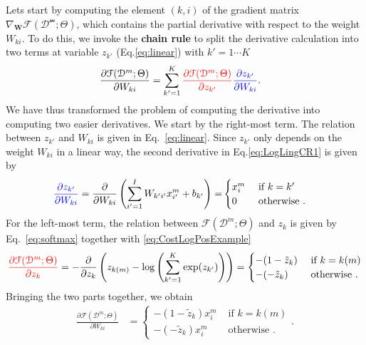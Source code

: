 Lets start by computing the element $(k,i)$ of the gradient matrix
$\nabla_\mathbf{W}\mathcal{F}(\mathcal{D^m};\Theta)$, which contains the partial
derivative with respect to the weight $W_{ki}$. To do this, we invoke the
\textbf{chain rule} to split the derivative calculation into two terms at
variable $z_{k'}$ (Eq.\ref{eq:linear}) with $k'=1\cdots K$
%
\begin{align}
\frac{\partial \mathcal{F}(\mathcal{D}^m;\Theta)}{\partial W_{ki}} & = \sum_{k'=1}^{K} { \color{red} \frac{\partial \mathcal{F}(\mathcal{D}^m;\Theta)}{\partial z_{k'}} }{ \color{blue} \frac{\partial z_{k'}}{\partial W_{ki}}}.
\label{eq:LogLingCR1}
\end{align}
%
We have thus transformed the problem of computing the derivative into computing
two easier derivatives. We start by the right-most term. The relation between
$z_{k'}$ and $W_{ki}$ is given in Eq.~\ref{eq:linear}. Since $z_{k'}$ only
depends on the weight $W_{ki}$ in a linear way, the second derivative in
Eq.\ref{eq:LogLingCR1} is given by
\begin{align}
{ \color{blue} \frac{\partial z_{k'}}{\partial W_{ki}}} = \frac{\partial }{\partial W_{ki}}\left(\sum_{i'=1}^{I} W_{k'i'} x^m_{i'} + b_{k'} \right) =
  &\begin{cases}
      x_i^m  &  \mbox{ if } k = k'\\
      0    &  \mbox{ otherwise }.
  \end{cases}
  \label{eq:partialLinear}
\end{align}
%
\noindent For the left-most term, the relation between $\mathcal{F}(\mathcal{D}^m;\Theta)$ and $z_k$ is given by Eq.~\ref{eq:softmax} together with \ref{eq:CostLogPosExample}
%
\begin{align}
{ \color{red} \frac{\partial \mathcal{F}(\mathcal{D}^m;\Theta)}{\partial z_{k}} }= - \frac{\partial }{\partial z_{k}}\left(z_{k(m)} - \log\left(\sum_{k'=1}^{K} \exp(z_{k'}) \right) \right) =
  \begin{cases}
      -(1 - \tilde{z}_k)  &  \mbox{ if } k = k(m)\\
      -(-\tilde{z}_k)     &  \mbox{ otherwise }.
  \end{cases}
  \label{eq:patialSoftmax}
\end{align}
%
Bringing the two parts together, we obtain
%
\begin{align}
\frac{\partial \mathcal{F}(\mathcal{D}^m;\Theta)}{\partial W_{ki}} & =
  \begin{cases}
      -(1 - \tilde{z}_k) x_i^m  &  \mbox{ if } k = k(m)\\
      -(-\tilde{z}_k) x_i^m     &  \mbox{ otherwise }.
  \end{cases}.
\label{eq:LogLingCR1}
\end{align}
%

